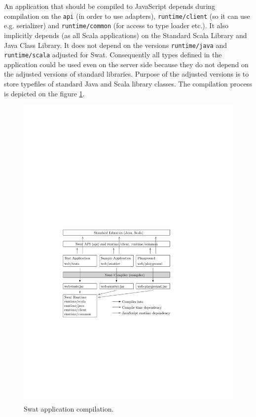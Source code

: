 \documentclass[12pt,a4paper]{report}
\begin{document}
An application that should be compiled to JavaScript depends during compilation on the \texttt{api} (in order to use adapters), \texttt{runtime/client} (so it can use e.g. serializer) and \texttt{runtime/common} (for access to type loader etc.). It also implicitly depends (as all Scala applications) on the Standard Scala Library and Java Class Library. It does not depend on the versions \texttt{runtime/java} and \texttt{runtime/scala} adjusted for Swat. Consequently all types defined in the application could be used even on the server side because they do not depend on the adjusted versions of standard libraries. Purpose of the adjusted versions is to store typefiles of standard Java and Scala library classes. The compilation process is depicted on the figure \ref{AppCompilation}.

\begin{figure}[ht]
  \centering
	\includegraphics[width=\linewidth,height=\textheight,keepaspectratio]{img/AppCompilation.pdf}
	\caption{Swat application compilation.}
	\label{AppCompilation}
\end{figure}
\end{document}
